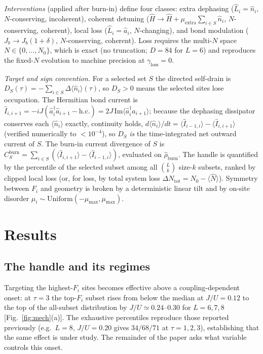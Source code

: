 \documentclass[aps,pra,reprint,amsmath,amssymb,longbibliography,floatfix]{revtex4-2}
\newcommand{\Fi}{F_i}
\newcommand{\nop}{\hat{n}}
\newcommand{\adag}{\hat{a}^\dagger}
\newcommand{\aop}{\hat{a}}
\newcommand{\rhob}{\hat{\rho}_{\mathrm{burn}}}
\newcommand{\DS}{D_S}
\newcommand{\Cb}{C_S^{\mathrm{burn}}}
\newcommand{\nexp}{\langle\nop_i\rangle}
\begin{document}
\emph{Interventions} (applied after burn-in) define four classes: extra dephasing
($\hat L_i=\nop_i$, $N$-conserving, incoherent), coherent detuning
($\hat H\to\hat H+\mu_{\mathrm{extra}}\sum_{i\in S}\nop_i$, $N$-conserving, coherent), local loss
($\hat L_i=\aop_i$, $N$-changing), and bond modulation ($J_b\to J_b(1+\delta)$, $N$-conserving,
coherent). Loss requires the multi-$N$ space $N\in\{0,\dots,N_0\}$, which is exact (no truncation;
$D=84$ for $L=6$) and reproduces the fixed-$N$ evolution to machine precision at
$\gamma_{\mathrm{loss}}=0$.

\emph{Target and sign convention.} For a selected set $S$ the directed self-drain is
$\DS(\tau)=-\sum_{i\in S}\Delta\nexp(\tau)$, so $\DS>0$ means the selected sites lose occupation.
The Hermitian bond current is
$\hat I_{i,i+1}=-iJ(\adag_i\aop_{i+1}-\mathrm{h.c.})=2J\,\mathrm{Im}\langle\adag_i\aop_{i+1}\rangle$;
because the dephasing dissipator conserves each $\nexp$ exactly, continuity holds,
$d\nexp/dt=\langle\hat I_{i-1,i}\rangle-\langle\hat I_{i,i+1}\rangle$ (verified numerically to
$<10^{-4}$), so $\DS$ \emph{is} the time-integrated net outward current of $S$. The burn-in current
divergence of $S$ is $\Cb=\sum_{i\in S}(\langle\hat I_{i,i+1}\rangle-\langle\hat I_{i-1,i}\rangle)$,
evaluated on $\rhob$. The handle is quantified by the percentile of the selected subset among all
$\binom{L}{k}$ size-$k$ subsets, ranked by clipped local loss (or, for loss, by total system loss
$\Delta N_{\mathrm{tot}}=N_0-\langle\hat N\rangle$). Symmetry between $\Fi$ and geometry is broken by
a deterministic linear tilt and by on-site disorder $\mu_i\sim\mathrm{Uniform}(-\mu_{\max},\mu_{\max})$.

\section{Results}

\subsection{The handle and its regimes}
Targeting the highest-$\Fi$ sites becomes effective above a coupling-dependent onset: at $\tau=3$
the top-$\Fi$ subset rises from below the median at $J/U=0.12$ to the top of the all-subset
distribution by $J/U\simeq0.24$--$0.30$ for $L=6,7,8$ [Fig.~\ref{fig:mech}(a)]. The exhaustive
percentiles reproduce those reported previously (e.g.\ $L=8$, $J/U=0.20$ gives $34/68/71$ at
$\tau=1,2,3$), establishing that the same effect is under study. The remainder of the paper asks
what variable controls this onset.
\end{document}
